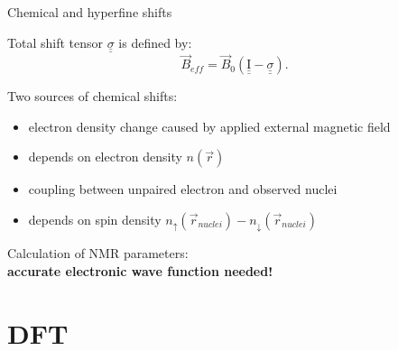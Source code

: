 \documentclass[slovene, usenames,dvipsnames]{beamer}
\begin{document}
\begin{frame}{Chemical and hyperfine shifts}

         \begin{definition}
 Total shift tensor $\underline{\underline{\sigma}}$ is defined by:
        \vspace*{-0.5\baselineskip}
        \centering
    \begin{equation} \nonumber
      \vec{B}_{eff}=\vec{B}_0\left( \underline{\underline{ \mathrm I }} - \underline{\underline{ \sigma}} \right).
    \end{equation}
  \end{definition}

  \centering Two sources of chemical shifts:
  
  \begin{minipage}[t]{0.5\textwidth}
    \begin{itemize}
     \item electron density change caused by applied external magnetic field
     \item depends on electron density $n(\vec r)$
      \end{itemize}
  \end{minipage}%
  \begin{minipage}[t]{0.5\textwidth}
    \begin{itemize}
      \item coupling between unpaired electron and observed nuclei
     \item depends on spin density $n_{\uparrow}(\vec r_{nuclei}) - n_{\downarrow}(\vec r_{nuclei})$
      \end{itemize}
    \end{minipage}
    Calculation of NMR parameters:\\\bf{accurate electronic wave function needed!}
  \end{frame}

  \section{DFT}
\end{document}
